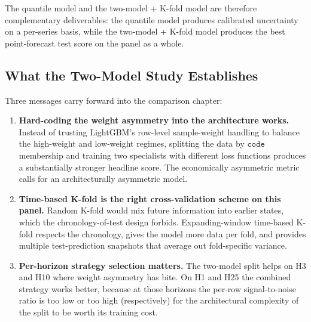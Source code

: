 The quantile model and the two-model + K-fold model are therefore complementary deliverables: the quantile model produces calibrated uncertainty on a per-series basis, while the two-model + K-fold model produces the best point-forecast test score on the panel as a whole.

\subsection{What the Two-Model Study Establishes}
\label{sec:two_model:conclusions}

Three messages carry forward into the comparison chapter:

\begin{enumerate}
  \item \textbf{Hard-coding the weight asymmetry into the architecture works.} Instead of trusting LightGBM's row-level sample-weight handling to balance the high-weight and low-weight regimes, splitting the data by $\mathtt{code}$ membership and training two specialists with different loss functions produces a substantially stronger headline score. The economically asymmetric metric calls for an architecturally asymmetric model.
  \item \textbf{Time-based K-fold is the right cross-validation scheme on this panel.} Random K-fold would mix future information into earlier states, which the chronology-of-test design forbids. Expanding-window time-based K-fold respects the chronology, gives the model more data per fold, and provides multiple test-prediction snapshots that average out fold-specific variance.
  \item \textbf{Per-horizon strategy selection matters.} The two-model split helps on H3 and H10 where weight asymmetry has bite. On H1 and H25 the combined strategy works better, because at those horizons the per-row signal-to-noise ratio is too low or too high (respectively) for the architectural complexity of the split to be worth its training cost.
\end{enumerate}
